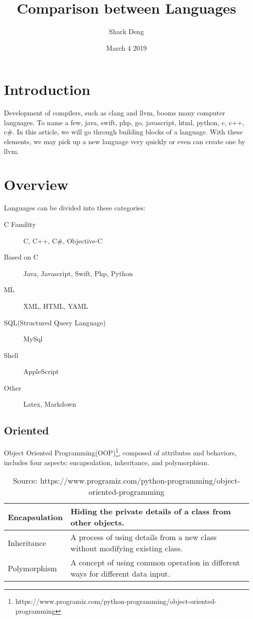 \documentclass[12pt, a4pape]{article}
\begin{document}
\title{\textbf{Comparison between Languages}}
\author{Shark Deng}
\date{March 4 2019}
\maketitle

\section{Introduction}
Development of compilers, such as clang and llvm, booms many computer languages. To name a few, java, swift, php, go, javascript, html, python, c, c++, c\#. In this article, we will go through building blocks of a language. With these elements, we may pick up a new language very quickly or even can create one by llvm.

\section{Overview}
	Languages can be divided into these categories:
	\begin{description}
		\item[C Famility] C, C++, C\#, Objective-C
		\item[Based on C] Java, Javascript, Swift, Php, Python
		\item[ML] XML, HTML, YAML
		\item[SQL(Structured Query Language)]  MySql
		\item[Shell] AppleScript
		\item[Other] Latex, Markdown
	\end{description}
	

	
	\subsection{Oriented}
	Object Oriented Programming(OOP)\footnote{https://www.programiz.com/python-programming/object-oriented-programming}, composed of attributes and behaviors, includes four aspects: encapsulation, inheritance, and polymorphism.
	\begin{table}[H]
	\begin{tabular}{l|l}
	\toprule
	Encapsulation & Hiding the private details of a class from other objects. \\
	\hline
	Inheritance & A process of using details from a new class without modifying existing class.\\
	\hline
	Polymorphism & A concept of using common operation in different ways for different data input. \\
	\bottomrule
	\end{tabular}
	\caption{Source: https://www.programiz.com/python-programming/object-oriented-programming}
	\end{table}
	
\end{document}
